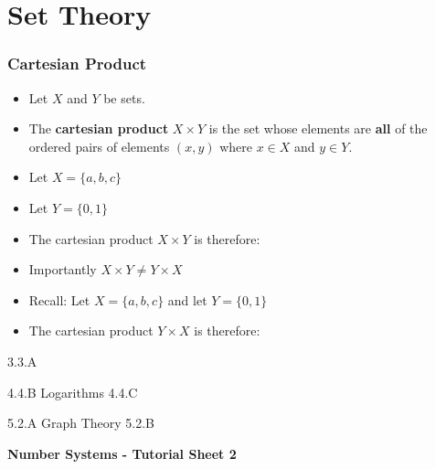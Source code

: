 \documentclass[]{report}
\begin{document}
\chapter{Set Theory}



\subsection{Cartesian Product}
{
\begin{itemize}
\item Let $X$ and $Y$ be sets.
\item The \textbf{cartesian product} $X \times Y$ is the set whose elements are \textbf{all} of 
the ordered pairs of elements $(x,y)$ where $x \in X$ and $y \in Y$.
\end{itemize}

\begin{itemize}
\item Let $X = \{a,b,c\}$
\item Let $Y = \{0,1\}$ 
\item The cartesian product $X \times Y$ is therefore:
\end{itemize}

\begin{itemize}
\item Importantly $X \times Y \neq Y \times X$
\item Recall: Let $X = \{a,b,c\}$ and let $Y = \{0,1\}$ 
\item The cartesian product $Y \times X$ is therefore:
\end{itemize}
}



3.3.A

4.4.B Logarithms
4.4.C 


5.2.A Graph Theory
5.2.B






\begin{center}
  \textbf{Number Systems - Tutorial Sheet 2}
\end{center}
\end{document}
